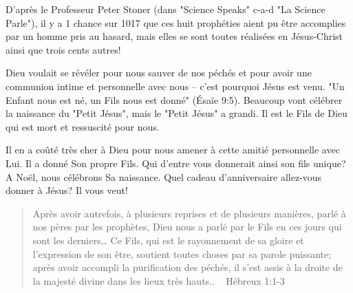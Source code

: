 D'après le Professeur Peter Stoner (dans "Science Speaks" c-a-d "La Science Parle"), il y a 1 chance sur 1017 que ces huit prophéties aient pu être accomplies par un homme pris au hasard, mais elles se sont toutes réalisées en Jésus-Christ ainsi que trois cents autres!

Dieu voulait se révéler pour nous sauver de nos péchés et pour avoir une communion intime et personnelle avec nous – c'est pourquoi Jésus est venu. "Un Enfant nous est né, un Fils nous est donné" (Ésaïe 9:5). Beaucoup vont célébrer la naissance du "Petit Jésus", mais le "Petit Jésus" a grandi. Il est le Fils de Dieu qui est mort et ressuscité pour nous.

Il en a coûté très cher à Dieu pour nous amener à cette amitié personnelle avec Lui. Il a donné Son propre Fils. Qui d'entre vous donnerait ainsi son fils unique? A Noël, nous célébrons Sa naissance. Quel cadeau d'anniversaire allez-vous donner à Jésus? Il vous veut!

\begin{quote}
Après avoir autrefois, à plusieurs reprises et de plusieurs manières, parlé à nos pères par les prophètes, Dieu nous a parlé par le Fils en ces jours qui sont les derniers… Ce Fils, qui est le rayonnement de sa gloire et l’expression de son être, soutient toutes choses par sa parole puissante; après avoir accompli la purification des péchés, il s’est assis à la droite de la majesté divine dans les lieux très hauts..
                                               ~ Hébreux 1:1-3 
\end{quote}

